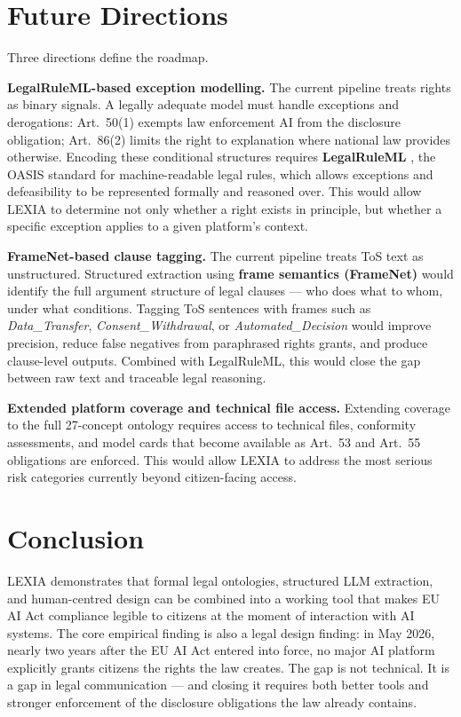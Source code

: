 \documentclass[12pt, a4paper]{article}
\begin{document}
\section{Future Directions}

Three directions define the roadmap.

\textbf{LegalRuleML-based exception modelling.} The current pipeline treats rights as binary signals. A legally adequate model must handle exceptions and derogations: Art.\ 50(1) exempts law enforcement AI from the disclosure obligation; Art.\ 86(2) limits the right to explanation where national law provides otherwise. Encoding these conditional structures requires \textbf{LegalRuleML} \cite{legalruleml}, the OASIS standard for machine-readable legal rules, which allows exceptions and defeasibility to be represented formally and reasoned over. This would allow LEXIA to determine not only whether a right exists in principle, but whether a specific exception applies to a given platform's context.

\textbf{FrameNet-based clause tagging.} The current pipeline treats ToS text as unstructured. Structured extraction using \textbf{frame semantics (FrameNet)} \cite{fillmore2002} would identify the full argument structure of legal clauses --- who does what to whom, under what conditions. Tagging ToS sentences with frames such as \emph{Data\_Transfer}, \emph{Consent\_Withdrawal}, or \emph{Automated\_Decision} would improve precision, reduce false negatives from paraphrased rights grants, and produce clause-level outputs. Combined with LegalRuleML, this would close the gap between raw text and traceable legal reasoning.

\textbf{Extended platform coverage and technical file access.} Extending coverage to the full 27-concept ontology requires access to technical files, conformity assessments, and model cards that become available as Art.\ 53 and Art.\ 55 obligations are enforced. This would allow LEXIA to address the most serious risk categories currently beyond citizen-facing access.

\section{Conclusion}

LEXIA demonstrates that formal legal ontologies, structured LLM extraction, and human-centred design can be combined into a working tool that makes EU AI Act compliance legible to citizens at the moment of interaction with AI systems. The core empirical finding is also a legal design finding: in May 2026, nearly two years after the EU AI Act entered into force, no major AI platform explicitly grants citizens the rights the law creates. The gap is not technical. It is a gap in legal communication --- and closing it requires both better tools and stronger enforcement of the disclosure obligations the law already contains.
\end{document}
